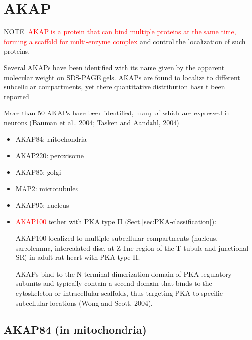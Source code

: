 



\section{AKAP}
\label{sec:AKAP}

NOTE: \textcolor{red}{AKAP is a protein that can bind multiple proteins at the
same time, forming a scaffold for multi-enzyme complex} and control the
localization of such proteins.

Several AKAPs have been identified with its name given by the apparent
molecular weight on SDS-PAGE gels. AKAPs are found to localize to different
subcellular compartments, yet there quantitative distribution hasn't been
reported \citep{Yang1998}

More than 50 AKAPs have been identified, many of which are expressed in neurons
(Bauman et al., 2004; Tasken and Aandahl, 2004)
\begin{itemize}

  \item AKAP84: mitochondria

  \item AKAP220: peroxisome

  \item AKAP85: golgi

  \item MAP2: microtubules

  \item AKAP95: nucleus
  
  \item \textcolor{red}{AKAP100} tether with PKA type II
  (Sect.\ref{sec:PKA-classification}):
  
  AKAP100 localized to multiple subcellular compartments (nucleus, sarcolemma,
  intercalated disc, at Z-line region of the T-tubule and junctional SR) in
  adult rat heart with PKA type II.
  
  AKAPs bind to the N-terminal dimerization domain of PKA regulatory subunits
  and typically contain a second domain that binds to the cytoskeleton or
  intracellular scaffolds, thus targeting PKA to specific subcellular locations
  (Wong and Scott, 2004).   
\end{itemize}

\subsection{AKAP84 (in mitochondria)}
\label{sec:AKAP84}



